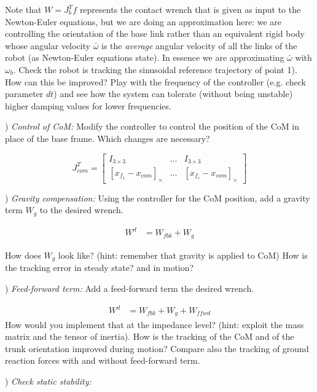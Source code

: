 \documentclass{report}
\newcommand{\mat}[1]{\ensuremath{\begin{bmatrix}#1\end{bmatrix}}}	%
\begin{document}
Note that $W = J_b^Tf$ represents the contact wrench that is given as input to the Newton-Euler equations, but we are doing an approximation here: we are controlling the orientation of the base link rather than an equivalent rigid body whose angular velocity $\bar{\omega}$ is the \textit{average} angular velocity of all the links of the robot (as Newton-Euler equations state). In essence we are approximating  $\bar{\omega}$ with ${\omega}_b$.
Check the robot is tracking the sinusoidal reference trajectory of point 1). How can this be improved? Play with the frequency of the controller (e.g. check parameter $dt$) and see how the system can tolerate (without being unstable)  higher damping values for lower frequencies.

\quad

) \textit{Control of CoM:}
Modify the controller to control the position of the CoM in place of the base frame.
Which changes are necessary?


\begin{equation}
J_{com}^T = \mat{I_{3\times3} & \dots & I_{3\times3} \\
	[x_{f_1} - x_{com}]_{\times} & \dots & [x_{f_c} - x_{com}]_{\times}}
\end{equation}

) \textit{Gravity compensation:}
Using the controller for the CoM position, add a gravity term $W_g$ to the desired wrench.

\begin{align}
W^d &= W_{fbk} +  W_g
\end{align}

How does $W_g$ look like? (hint: remember that gravity is applied to CoM)
How is the tracking error in steady state? and in motion?

\quad

) \textit{Feed-forward term:}
Add a feed-forward term the desired wrench. 

\begin{align}
W^d &= W_{fbk} +  W_g + W_{ffwd}
\end{align}
How would you implement that at the impedance level? (hint: exploit the mass matrix and the tensor of inertia).
How is the tracking of the CoM and of the trunk orientation improved during motion? 
Compare also the tracking of ground reaction  forces with and without feed-forward term.

\quad

) \textit{Check static stability:}
\end{document}
